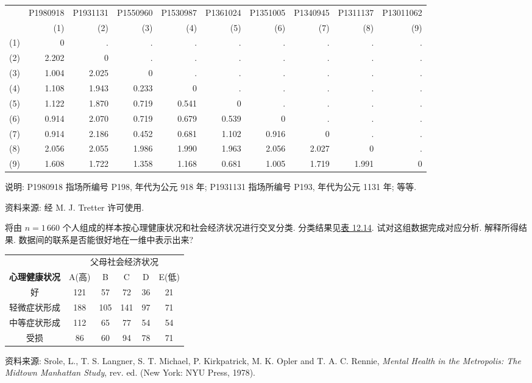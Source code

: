\begin{mvtable}
\label{tab:12.13}
\setlength{\tabcolsep}{3.0pt}%
%
\begin{tabular}{l*{9}{r}}
\toprule
& P1980918 & P1931131 & P1550960 & P1530987 & P1361024 & P1351005 & P1340945 & P1311137 & P13011062 \\
& (1) & (2) & (3) & (4) & (5) & (6) & (7) & (8) & (9) \\
\midrule
(1) & 0 & . & . & . & . & . & . & . & . \\
(2) & 2.202 & 0 & . & . & . & . & . & . & . \\
(3) & 1.004 & 2.025 & 0 & . & . & . & . & . & . \\
(4) & 1.108 & 1.943 & 0.233 & 0 & . & . & . & . & . \\
(5) & 1.122 & 1.870 & 0.719 & 0.541 & 0 & . & . & . & . \\
(6) & 0.914 & 2.070 & 0.719 & 0.679 & 0.539 & 0 & . & . & . \\
(7) & 0.914 & 2.186 & 0.452 & 0.681 & 1.102 & 0.916 & 0 & . & . \\
(8) & 2.056 & 2.055 & 1.986 & 1.990 & 1.963 & 2.056 & 2.027 & 0 & . \\
(9) & 1.608 & 1.722 & 1.358 & 1.168 & 0.681 & 1.005 & 1.719 & 1.991 & 0 \\
\bottomrule
\end{tabular}
\end{mvtable}

说明: P1980918 指场所编号 P198, 年代为公元 918 年; P1931131 指场所编号 P193, 年代为公元 1131 年; 等等.

资料来源: 经 M. J. Tretter 许可使用.

\quad 将由 $n=1\,660$ 个人组成的样本按心理健康状况和社会经济状况进行交叉分类. 分类结果见\hyperref[tab:12.14]{表 12.14}. 试对这组数据完成对应分析. 解释所得结果. 数据间的联系是否能很好地在一维中表示出来?

\begin{mvtable}
\label{tab:12.14}
\setlength{\tabcolsep}{4pt}%
\begin{tabular}{c|ccccc}
\toprule
& \multicolumn{5}{c}{父母社会经济状况} \\
\cmidrule(lr){2-6}
\textbf{心理健康状况} & A(高) & B & C & D & E(低) \\
\midrule
好 & 121 & 57 & 72 & 36 & 21 \\
轻微症状形成 & 188 & 105 & 141 & 97 & 71 \\
中等症状形成 & 112 & 65 & 77 & 54 & 54 \\
受损 & 86 & 60 & 94 & 78 & 71 \\
\bottomrule
\end{tabular}
\end{mvtable}

资料来源: Srole, L., T. S. Langner, S. T. Michael, P. Kirkpatrick, M. K. Opler and T. A. C. Rennie, \textit{Mental Health in the Metropolis: The Midtown Manhattan Study}, rev. ed. (New York: NYU Press, 1978).
